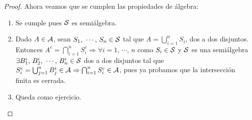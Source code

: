 \begin{lemma}
\begin{proof}
        Ahora veamos que se cumplen las propiedades de álgebra:
        \begin{enumerate}
            \item Se cumple pues $\mathcal{S}$ es semiálgebra.
            \item Dado $A \in \mathcal{A}$, sean $S_1 \text{, } \cdots \text{, } S_n \in \mathcal{S}$ tal que $A = \bigcup_{i = 1}^n S_i$, dos a dos disjuntos. Entonces
            $A^c = \bigcap_{i = 1}^n S_i^c \Rightarrow \forall i = 1 \text{, } \cdots \text{, } n$ como $S_i \in \mathcal{S}$ y $\mathcal{S}$ es una semiálgebra $\exists B_1^i \text{, } B_2^i \text{, } \cdots \text{, } B_n^i \in \mathcal{S}$ dos a dos disjuntos  
            tal que $S_i^c = \bigcup_{j = 1}^n B_j^i \in \mathcal{A} \Rightarrow \bigcap_{i = 1}^n S_i^c \in \mathcal{A}$, pues ya probamos que la intersección finita es cerrada.
            \item Queda como ejercicio.
        \end{enumerate}
    \end{proof}
\end{lemma}